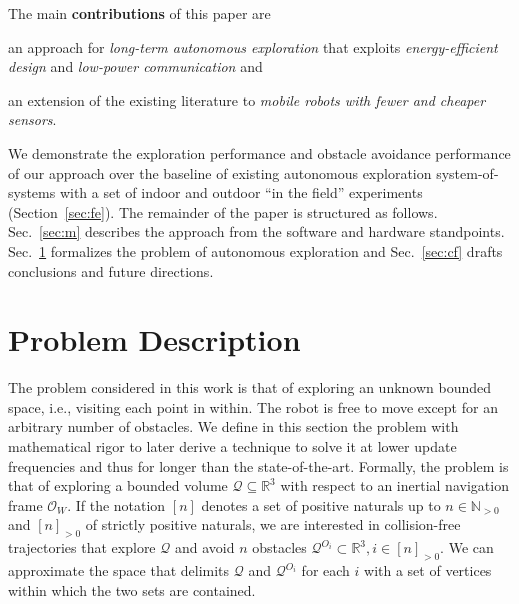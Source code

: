\documentclass[lettersize,journal,twoside]{IEEEtran}
\theoremstyle{definition}
\begin{document}
The main \textbf{contributions} of this paper are
\begin{enumerate*}[label={(\alph*)},font={\textit}]
\item an approach for \textit{long-term autonomous exploration} that exploits \textit{energy-efficient design} and \textit{low-power communication} and
\item an extension of the existing literature to \textit{mobile robots with fewer and cheaper sensors}.
\end{enumerate*}
We demonstrate the exploration performance and obstacle avoidance performance of our approach  
over the baseline of existing autonomous exploration system-of-systems with a set of indoor and outdoor ``in the field'' experiments (Section~\ref{sec:fe}). 
The remainder of the paper is structured as follows.
Sec.~\ref{sec:m} describes the approach from the software and hardware standpoints. %
Sec.~\ref{sec:pf} formalizes the problem of autonomous exploration and Sec.~\ref{sec:cf} drafts conclusions %
and future directions.




\section{Problem Description}
\label{sec:pf}
\noindent
The problem considered in this work %
is that of exploring an unknown bounded space, i.e., visiting each point in within.
The robot is free to move except for an arbitrary number of obstacles.
We define in this section the problem with mathematical rigor to later derive a technique to solve it at lower update frequencies and thus for longer than the state-of-the-art. 
Formally, the problem 
is that of exploring a bounded volume $\mathcal{Q}\subseteq\mathbb{R}^3$ with respect to an inertial navigation frame $\mathcal{O}_W$. If the notation $[n]$ denotes a set of positive naturals up to $n\in\mathbb{N}_{>0}$ and $[n]_{>0}$ of strictly positive naturals, we are interested in collision-free trajectories that explore $\mathcal{Q}$ and avoid $n$ obstacles $\mathcal{Q}^{O_i}\subset\mathbb{R}^3,i\in[n]_{>0}$. We can approximate the space that delimits $\mathcal{Q}$ and $\mathcal{Q}^{O_i}$ for each $i$ with a set of vertices within which the two sets are contained.
\end{document}
